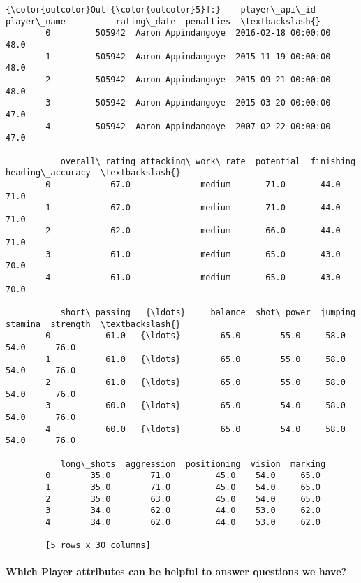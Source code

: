 \documentclass[11pt]{article}
\begin{document}
\begin{Verbatim}[commandchars=\\\{\}]
{\color{outcolor}Out[{\color{outcolor}5}]:}    player\_api\_id         player\_name          rating\_date  penalties  \textbackslash{}
        0         505942  Aaron Appindangoye  2016-02-18 00:00:00       48.0   
        1         505942  Aaron Appindangoye  2015-11-19 00:00:00       48.0   
        2         505942  Aaron Appindangoye  2015-09-21 00:00:00       48.0   
        3         505942  Aaron Appindangoye  2015-03-20 00:00:00       47.0   
        4         505942  Aaron Appindangoye  2007-02-22 00:00:00       47.0   
        
           overall\_rating attacking\_work\_rate  potential  finishing  heading\_accuracy  \textbackslash{}
        0            67.0              medium       71.0       44.0              71.0   
        1            67.0              medium       71.0       44.0              71.0   
        2            62.0              medium       66.0       44.0              71.0   
        3            61.0              medium       65.0       43.0              70.0   
        4            61.0              medium       65.0       43.0              70.0   
        
           short\_passing   {\ldots}     balance  shot\_power  jumping  stamina  strength  \textbackslash{}
        0           61.0   {\ldots}        65.0        55.0     58.0     54.0      76.0   
        1           61.0   {\ldots}        65.0        55.0     58.0     54.0      76.0   
        2           61.0   {\ldots}        65.0        55.0     58.0     54.0      76.0   
        3           60.0   {\ldots}        65.0        54.0     58.0     54.0      76.0   
        4           60.0   {\ldots}        65.0        54.0     58.0     54.0      76.0   
        
           long\_shots  aggression  positioning  vision  marking  
        0        35.0        71.0         45.0    54.0     65.0  
        1        35.0        71.0         45.0    54.0     65.0  
        2        35.0        63.0         45.0    54.0     65.0  
        3        34.0        62.0         44.0    53.0     62.0  
        4        34.0        62.0         44.0    53.0     62.0  
        
        [5 rows x 30 columns]
\end{Verbatim}
            
    \hypertarget{which-player-attributes-can-be-helpful-to-answer-questions-we-have}{%
\paragraph{Which Player attributes can be helpful to answer questions we
have?}\label{which-player-attributes-can-be-helpful-to-answer-questions-we-have}}
\end{document}
